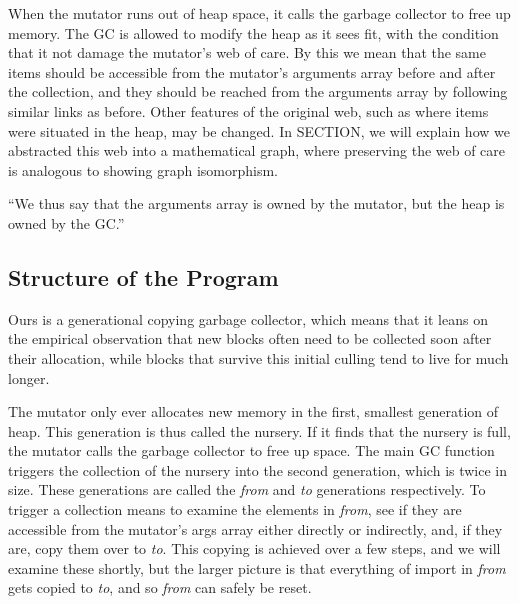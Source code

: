 When the mutator runs out of heap space, 
it calls the garbage collector to free up memory. 
The GC is allowed to modify the heap as
it sees fit, with the condition that it not damage the 
mutator's web of care. By this we mean that the same items 
should be accessible from the mutator's arguments
array before and after the collection, and they 
should be reached from the arguments array by 
following similar links as before. 
Other features of the original web, such as where 
items were situated in the heap, may be changed. 
In SECTION, we will explain how we abstracted this
web into a mathematical graph, where preserving the 
web of care is analogous to showing graph isomorphism.

``We thus say that the arguments array is owned by the 
mutator, but the heap is owned by the GC.''

\subsection{Structure of the Program}
\label{sec:gcstructure}
Ours is a generational copying garbage collector, which
means that it leans on the empirical observation that
new blocks often need to be collected soon after their
allocation, while blocks that survive this initial
culling tend to live for much longer.

The mutator only ever allocates new memory in the first, 
smallest generation of heap. This generation is thus 
called the nursery. If it finds that the nursery is full, 
the mutator calls the garbage collector to free up space.
The main GC function triggers the collection of the nursery
into the second generation, which is twice in size. These generations
are called the \emph{from} and \emph{to} generations respectively.
To trigger a collection means to examine the elements 
in \emph{from}, see if they are accessible from the mutator's
args array either directly or indirectly, and, if they are, 
copy them over to \emph{to}. This copying is achieved over a few steps, 
and we will examine these shortly, but the larger picture is that 
everything of import in \emph{from} gets copied to \emph{to}, 
and so \emph{from} can safely be reset. 

